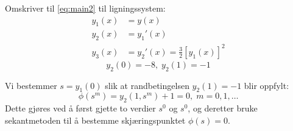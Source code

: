 Omskriver til \eqref{eq:main2} til ligningssystem:
\begin{align}
  y_1(x) & = y(x) \\
  y_2(x) & = y_1'(x) \\
  y_3(x) & = y_2'(x) = \frac{3}{2} \left[ y_1(x) \right]^2
\end{align}
\begin{equation}
  y_2(0) = -8, \; y_2(1) = -1 \nonumber
\end{equation}

Vi bestemmer $s = y_1(0)$ slik at randbetingelsen $y_2(1) = -1$ blir oppfylt:
\begin{equation}
  \phi(s^m) = y_2(1,s^m) + 1 = 0, \; m = 0,1,\dots
\end{equation}
Dette gjøres ved å først gjette to verdier $s^0$ og $s^0$, og deretter bruke sekantmetoden til å bestemme skjæringspunktet $\phi(s) = 0$.




